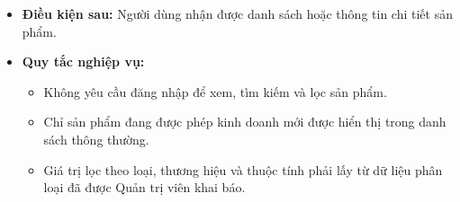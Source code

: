 \begin{itemize}
\begin{itemize}
        \item Nếu chương trình giảm giá hết hạn, hệ thống chỉ hiển thị giá niêm yết.
    \end{itemize}
    \item \textbf{Điều kiện sau:} Người dùng nhận được danh sách hoặc thông tin chi tiết sản phẩm.
    \item \textbf{Quy tắc nghiệp vụ:}
    \begin{itemize}
        \item Không yêu cầu đăng nhập để xem, tìm kiếm và lọc sản phẩm.
        \item Chỉ sản phẩm đang được phép kinh doanh mới được hiển thị trong danh sách thông thường.
        \item Giá trị lọc theo loại, thương hiệu và thuộc tính phải lấy từ dữ liệu phân loại đã được Quản trị viên khai báo.
    \end{itemize}
\end{itemize}

